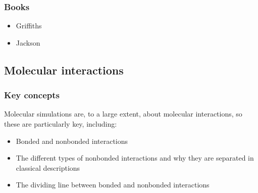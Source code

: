\documentclass[9pt,bestpractices]{livecoms}
\begin{document}
\subsubsection{Books}
\begin{itemize}
\item Griffiths
\item Jackson
\end{itemize}


\subsection{Molecular interactions}
\label{sec:mol_interactions}
\subsubsection{Key concepts}
Molecular simulations are, to a large extent, about molecular interactions, so these are particularly key, including:
\begin{itemize}
\item Bonded and nonbonded interactions
\item The different types of nonbonded interactions and why they are separated in classical descriptions
\item The dividing line between bonded and nonbonded interactions
\end{itemize}
\end{document}
